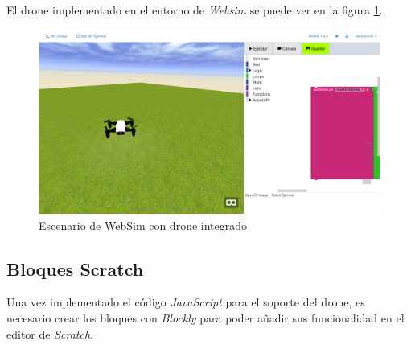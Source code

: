 El drone implementado en el entorno de \textit{Websim} se puede ver en la figura \ref{fig:escenarioDrone}.

   \begin{figure}[H]
    \centering
    \includegraphics[scale=0.3]{img/websimDrone.png}
    \caption{Escenario de WebSim con drone integrado} \label{fig:escenarioDrone}
    \end{figure}

\subsection{Bloques Scratch}


Una vez implementado el código \textit{JavaScript} para el soporte del drone, es necesario crear los bloques con \textit{Blockly} para poder añadir sus funcionalidad en el editor de \textit{Scratch}. 

